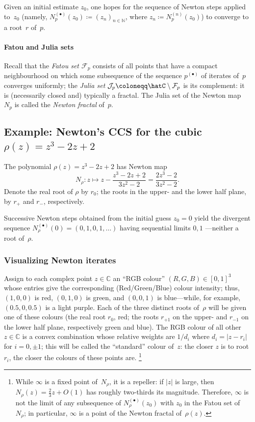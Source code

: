 Given an initial estimate $z_0$, one hopes for the sequence of Newton steps applied to~$z_0$ (namely, $N_p^{(\bullet)}(z_0) \coloneqq (z_n)_{n\in \mathbb{N}}$, where $z_n \coloneqq N_p^{(n)}(z_0)$)
to converge to a root~$r$ of~$p$.

\paragraph{Fatou and Julia sets}
Recall that the \emph{Fatou set $\mathcal{F}_p$} consists of all points that have a compact neighbourhood on which some subsequence of the sequence $p^{(\bullet)}$ of iterates of~$p$ converges uniformly;
the \emph{Julia set} $\mathcal{J}_p\coloneqq\hatC\setminus \mathcal{F}_p$ is its complement:
it is (necessarily closed and) typically a fractal.
The Julia set of the Newton map~$N_p$ is called the \emph{Newton fractal} of~$p$.

\subsection{Example: Newton's CCS for the cubic \texorpdfstring{${\rho}(z) = z^3-2z+2$}{rho(z) = z3-2z+2}}\label{sec:Newton-cubic}
The polynomial ${\rho}(z) = z^3-2z+2$ has Newton map
\begin{equation*}
  N_{\rho}: z \mapsto z - \frac{z^3-2z+2}{3z^2-2} = \frac{2z^3-2}{3z^2-2}.
\end{equation*}
Denote the real root of $\rho$ by $r_0$; the roots in the upper- and the lower half plane, by $r_{+}$ and $r_{-}$, respectively.

Successive Newton steps obtained from the initial guess $z_0=0$ yield the divergent sequence $N_{\rho}^{(\bullet)}(0) = (0, 1, 0, 1, \dots)$ having sequential limits $0, 1$ —neither a root of~${\rho}$.

\subsubsection{Visualizing Newton iterates}
Assign to each complex point $z\in \mathbb{C}$ an “RGB colour” $(R,G,B)\in[0,1]^3$ whose entries give the corresponding (Red/Green/Blue) colour intensity;
thus, $(1,0,0)$ is red, $(0,1,0)$ is green, and $(0,0,1)$ is blue—while, for example, $(0.5, 0, 0.5)$ is a light purple.
Each of the three distinct roots of~${\rho}$ will be given one of these colours
(the real root $r_0$, red; the roots $r_{+1}$ on the upper- and $r_{-1}$ on the lower half plane, respectively green and blue).
The RGB colour of all other~$z\in \mathbb{C}$ is a convex combination whose relative weights are $1/d_i$ where $d_i = |z-r_i|$ for $i=0, \pm1$;
this will be called the “standard” colour of~$z$:
the closer $z$ is to root $r_i$, the closer the colours of these points are.%
\footnote{While $\infty$ is a fixed point of~$N_{\rho}$, it is a repeller: if $|z|$ is large, then $N_{\rho}(z) = \frac{2}{3}z + O(1)$ has roughly two-thirds its magnitude.
Therefore, $\infty$ is not the limit of any subsequence of $N_{\rho}^{(\bullet)}(z_0)$ with $z_0$ in the Fatou set of~$N_{\rho}$; in particular, $\infty$ is a point of the Newton fractal of~${\rho}(z)$.}

